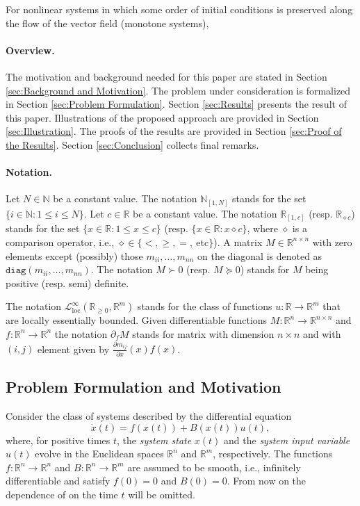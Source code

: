 \documentclass[10pt,twocolumn,twoside]{IEEEtran}
\theoremstyle{plain}
\theoremstyle{definition}
\theoremstyle{remark}
\begin{document}
For nonlinear systems in which some order of initial conditions is preserved along the flow of the vector field (monotone systems), 


\paragraph{Overview.} The motivation and background needed for this paper are stated in Section \ref{sec:Background and Motivation}. The problem under consideration is formalized in Section \ref{sec:Problem Formulation}. Section \ref{sec:Results} presents the result of this paper. Illustrations of the proposed approach are provided in Section \ref{sec:Illustration}. The proofs of the results are provided in Section \ref{sec:Proof of the Results}. Section \ref{sec:Conclusion} collects final remarks.

\paragraph{Notation.} Let $N\in\mathbb{N}$ be a constant value. The notation $\mathbb{N}_{[1,N]}$ stands for the set $\{i\in\mathbb{N}:1\leq i\leq N\}$. Let $c\in\mathbb{R}$ be a constant value. The notation $\mathbb{R}_{[1,c]}$ (resp. $\mathbb{R}_{\diamond c}$) stands for the set $\{x\in\mathbb{R}:1\leq x\leq c\}$ (resp.  $\{x\in\mathbb{R}:x\diamond c\}$, where $\diamond$ is a comparison operator, i.e., $\diamond\in\{<,\geq,=,\ \text{etc}\}$). A matrix $M\in\mathbb{R}^{n\times n}$ with zero elements except (possibly) those  $m_{ii},\ldots,m_{nn}$ on the diagonal is denoted as $\mathbin{\mathtt{diag}}(m_{ii},\ldots,m_{nn})$. The notation $M\succ 0$ (resp. $M\succeq 0$) stands for $M$ being positive (resp. semi) definite.

The notation $\mathcal{L}_{\mathrm{loc}}^\infty(\mathbb{R}_{\geq0},\mathbb{R}^m)$ stands for the class of functions $u:\mathbb{R}\to\mathbb{R}^m$ that are locally essentially bounded. Given differentiable functions $M:\mathbb{R}^n\to\mathbb{R}^{n\times n}$ and $f:\mathbb{R}^n\to\mathbb{R}^n$ the notation $\partial_fM$ stands for matrix with dimension $n\times n$ and with $(i,j)$ element given by $\frac{\partial m_{ij}}{\partial x}(x)f(x)$.


\subsection{Problem Formulation and Motivation}\label{sec:Problem Formulation and Motivation}

 Consider the class of systems described by the differential equation
\begin{equation}\label{eq:general system}
	\dot{x}(t)=f(x(t))+B(x(t))u(t),	
\end{equation}
where, for positive times $t$, the \emph{system state} $x(t)$ and the \emph{system input variable} $u(t)$ evolve in the Euclidean spaces $\mathbb{R}^n$ and $\mathbb{R}^m$, respectively. The functions $f:\mathbb{R}^n\to\mathbb{R}^n$ and $B:\mathbb{R}^n\to\mathbb{R}^m$ are assumed to be smooth, i.e., infinitely differentiable and satisfy $f(0)=0$ and $B(0)=0$. From now on the dependence of on the time $t$ will be omitted.
\end{document}
